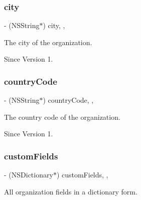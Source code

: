 \subsubsection{\texorpdfstring{city}{city}}
{\footnotesize\ttfamily -\/ (N\+S\+String$\ast$) city\hspace{0.3cm}{\ttfamily [read]}, {\ttfamily [nonatomic]}, {\ttfamily [assign]}}



The city of the organization. 

\begin{DoxySince}{Since}
Version 1. 
\end{DoxySince}
\hypertarget{class_x_i_organization_info_aa102d8963d3c01457a38f955ab52886b}{}\label{class_x_i_organization_info_aa102d8963d3c01457a38f955ab52886b} 
\subsubsection{\texorpdfstring{country\+Code}{countryCode}}
{\footnotesize\ttfamily -\/ (N\+S\+String$\ast$) country\+Code\hspace{0.3cm}{\ttfamily [read]}, {\ttfamily [nonatomic]}, {\ttfamily [assign]}}



The country code of the organization. 

\begin{DoxySince}{Since}
Version 1. 
\end{DoxySince}
\hypertarget{class_x_i_organization_info_acf05d4b2cc2f88ac2ad97deb7bbd5694}{}\label{class_x_i_organization_info_acf05d4b2cc2f88ac2ad97deb7bbd5694} 
\subsubsection{\texorpdfstring{custom\+Fields}{customFields}}
{\footnotesize\ttfamily -\/ (N\+S\+Dictionary$\ast$) custom\+Fields\hspace{0.3cm}{\ttfamily [read]}, {\ttfamily [nonatomic]}, {\ttfamily [assign]}}



All organization fields in a dictionary form. 

